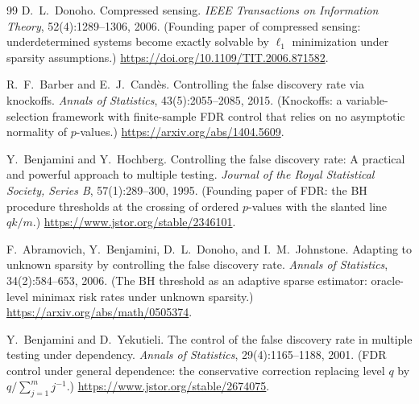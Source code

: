 \documentclass[11pt, a4paper]{article}
\theoremstyle{plain}
\theoremstyle{definition}
\theoremstyle{remark}
\begin{document}
\begin{thebibliography}{99}
D.~L.~Donoho.
\newblock Compressed sensing.
\newblock \emph{IEEE Transactions on Information Theory}, 52(4):1289--1306, 2006. (Founding paper of compressed sensing: underdetermined systems become exactly solvable by $\ell_1$ minimization under sparsity assumptions.)
\newblock \url{https://doi.org/10.1109/TIT.2006.871582}.

R.~F.~Barber and E.~J.~Cand\`es.
\newblock Controlling the false discovery rate via knockoffs.
\newblock \emph{Annals of Statistics}, 43(5):2055--2085, 2015. (Knockoffs: a variable-selection framework with finite-sample FDR control that relies on no asymptotic normality of $p$-values.)
\newblock \url{https://arxiv.org/abs/1404.5609}.

Y.~Benjamini and Y.~Hochberg.
\newblock Controlling the false discovery rate: A practical and powerful approach to multiple testing.
\newblock \emph{Journal of the Royal Statistical Society, Series B}, 57(1):289--300, 1995. (Founding paper of FDR: the BH procedure thresholds at the crossing of ordered $p$-values with the slanted line $qk/m$.)
\newblock \url{https://www.jstor.org/stable/2346101}.

F.~Abramovich, Y.~Benjamini, D.~L.~Donoho, and I.~M.~Johnstone.
\newblock Adapting to unknown sparsity by controlling the false discovery rate.
\newblock \emph{Annals of Statistics}, 34(2):584--653, 2006. (The BH threshold as an adaptive sparse estimator: oracle-level minimax risk rates under unknown sparsity.)
\newblock \url{https://arxiv.org/abs/math/0505374}.

Y.~Benjamini and D.~Yekutieli.
\newblock The control of the false discovery rate in multiple testing under dependency.
\newblock \emph{Annals of Statistics}, 29(4):1165--1188, 2001. (FDR control under general dependence: the conservative correction replacing level $q$ by $q / \sum_{j=1}^m j^{-1}$.)
\newblock \url{https://www.jstor.org/stable/2674075}.

\end{thebibliography}
\end{document}
